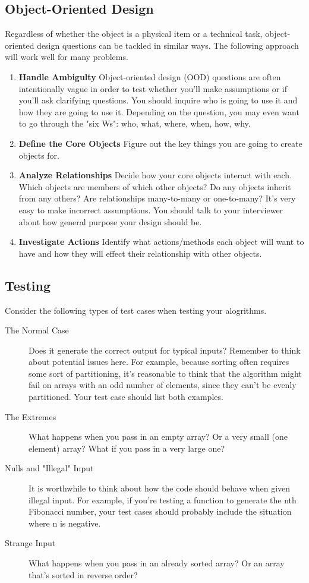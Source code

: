 \documentclass{article}
\begin{document}
	\subsection{Object-Oriented Design}
		Regardless of whether the object is a physical item or a technical task, object-oriented design questions can be tackled in similar ways. The following approach will work well for many problems.
		\begin{enumerate}
			\item {\bf Handle Ambigulty} Object-oriented design (OOD) questions are often intentionally vague in order to test whether you'll make assumptions or if you'll ask clarifying questions. You should inquire who is going to use it and how they are going to use it. Depending on the question, you may even want to go through the "six Ws": who, what, where, when, how, why.
			\item {\bf Define the Core Objects} Figure out the key things you are going to create objects for.
			\item {\bf Analyze Relationships} Decide how your core objects interact with each. Which objects are members of which other objects? Do any objects inherit from any others? Are relationships many-to-many or one-to-many? It's very easy to make incorrect assumptions. You should talk to your interviewer about how general purpose your design should be.
			\item {\bf Investigate Actions} Identify what actions/methods each object will want to have and how they will effect their relationship with other objects.
	\end{enumerate}

	\subsection{Testing}
		Consider the following types of test cases when testing your alogrithms.
		\begin{description}
			\item[The Normal Case] Does it generate the correct output for typical inputs? Remember to think about potential issues here. For example, because sorting often requires some sort of partitioning, it's reasonable to think that the algorithm might fail on arrays with an odd number of elements, since they can't be evenly partitioned. Your test case should list both examples.
			\item[The Extremes] What happens when you pass in an empty array? Or a very small (one element) array? What if you pass in a very large one?
			\item[Nulls and "Illegal" Input] It is worthwhile to think about how the code should behave when given illegal input. For example, if you're testing a function to generate the nth Fibonacci number, your test cases should probably include the situation where n is negative.
			\item[Strange Input] What happens when you pass in an already sorted array? Or an array that's sorted in reverse order?
		\end{description}
\end{document}
